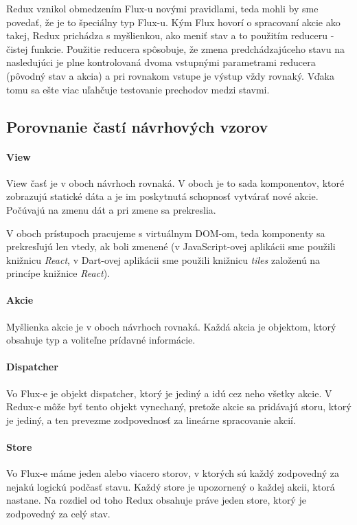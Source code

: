 Redux vznikol obmedzením Flux-u novými pravidlami, teda mohli by sme povedať, že je to špeciálny typ Flux-u. Kým Flux hovorí o spracovaní akcie ako takej, Redux prichádza s myšlienkou, ako meniť stav a to použitím reduceru - čistej funkcie. Použitie reducera spôsobuje, že zmena predchádzajúceho stavu na nasledujúci je plne kontrolovaná dvoma vstupnými parametrami reducera (pôvodný stav a akcia) a pri rovnakom vstupe je výstup vždy rovnaký. Vďaka tomu sa ešte viac uľahčuje testovanie prechodov medzi stavmi.

\subsection{Porovnanie častí návrhových vzorov}

\paragraph{View}
View časť je v oboch návrhoch rovnaká. V oboch je to sada komponentov, ktoré zobrazujú statické dáta a je im poskytnutá schopnosť vytvárať nové akcie. Počúvajú na zmenu dát a pri zmene sa prekreslia.

V oboch prístupoch pracujeme s virtuálnym DOM-om, teda komponenty sa prekresľujú len vtedy, ak boli zmenené (v JavaScript-ovej aplikácii sme použili knižnicu \emph{React}, v Dart-ovej aplikácii sme použili knižnicu \emph{tiles} založenú na princípe knižnice \emph{React}).

\paragraph{Akcie}
Myšlienka akcie je v oboch návrhoch rovnaká. Každá akcia je objektom, ktorý obsahuje typ a voliteľne prídavné informácie.

\paragraph{Dispatcher}
Vo Flux-e je objekt dispatcher, ktorý je jediný a idú cez neho všetky akcie. V Redux-e môže byť tento objekt vynechaný, pretože akcie sa pridávajú storu, ktorý je jediný, a ten prevezme zodpovednosť za lineárne spracovanie akcií.

\paragraph{Store}
Vo Flux-e máme jeden alebo viacero storov, v ktorých sú každý zodpovedný za nejakú logickú podčasť stavu. Každý store je upozornený o každej akcii, ktorá nastane. Na rozdiel od toho Redux obsahuje práve jeden store, ktorý je zodpovedný za celý stav.

